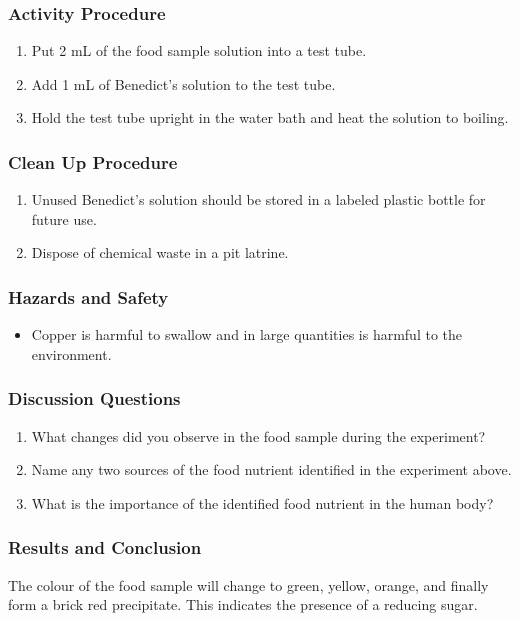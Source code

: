 \subsubsection*{Activity Procedure}
\begin{enumerate}
\item{Put 2 mL of the food sample solution into a test tube.}
\item{Add 1 mL of Benedict's solution to the test tube.}
\item{Hold the test tube upright in the water bath and heat the solution to boiling.}
\end{enumerate}

\subsubsection*{Clean Up Procedure}
\begin{enumerate}
\item{Unused Benedict's solution should be stored in a labeled plastic bottle for future use.}
\item{Dispose of chemical waste in a pit latrine.}
\end{enumerate}

\subsubsection*{Hazards and Safety}
\begin{itemize}
\item{Copper is harmful to swallow and in large quantities is harmful to the environment.}
\end{itemize}

\subsubsection*{Discussion Questions}
\begin{enumerate}
\item{What changes did you observe in the food sample during the experiment?}
\item{Name any two sources of the food nutrient identified in the experiment above.}
\item{What is the importance of the identified food nutrient in the human body?}
\end{enumerate}

\subsubsection*{Results and Conclusion}
The colour of the food sample will change to green, yellow, orange, and finally form a brick red precipitate. This indicates the presence of a reducing sugar.

